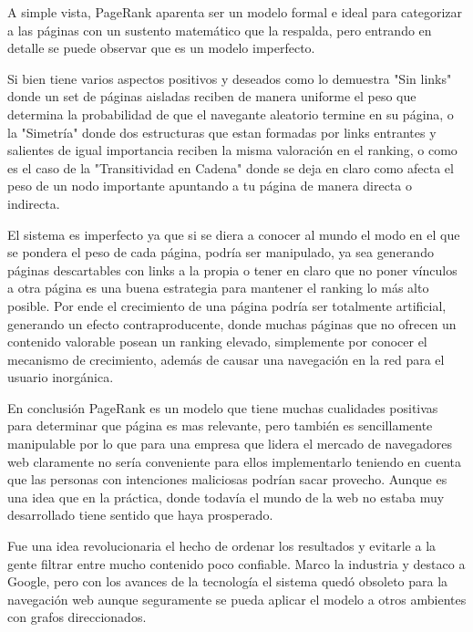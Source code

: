 \vspace{1em}

A simple vista, PageRank aparenta ser un modelo formal e ideal para categorizar a las páginas con un sustento matemático que la respalda, pero entrando en detalle se puede observar que es un modelo imperfecto.  

\vspace{1em}

Si bien tiene varios aspectos positivos y deseados como lo demuestra "Sin links" donde un set de páginas aisladas reciben de manera uniforme el peso que determina la probabilidad de que el navegante aleatorio termine en su página, o la "Simetría" donde dos estructuras que estan formadas por links entrantes y salientes de igual importancia reciben la misma valoración en el ranking, o como es el caso de la "Transitividad en Cadena" donde se deja en claro como afecta el peso de un nodo importante apuntando a tu página de manera directa o indirecta. 

\vspace{1em}

El sistema es imperfecto ya que si se diera a conocer al mundo el modo en el que se pondera el peso de cada página, podría ser manipulado, ya sea generando páginas descartables con links a la propia o tener en claro que no poner vínculos a otra página es una buena estrategia para mantener el ranking lo más alto posible. Por ende el crecimiento de una página podría ser totalmente artificial, generando un efecto contraproducente, donde muchas páginas que no ofrecen un contenido valorable posean un ranking elevado, simplemente por conocer el mecanismo de crecimiento, además de causar una navegación en la red para el usuario inorgánica.

\vspace{1em}

En conclusión PageRank es un modelo que tiene muchas cualidades positivas para determinar que página es mas relevante, pero también es sencillamente manipulable por lo que para una empresa que lidera el mercado de navegadores web claramente no sería conveniente para ellos implementarlo teniendo en cuenta que las personas con intenciones maliciosas podrían sacar provecho. Aunque es una idea que en la práctica, donde todavía el mundo de la web no estaba muy desarrollado tiene sentido que haya prosperado.

\vspace{1em}

Fue una idea revolucionaria el hecho de ordenar los resultados y evitarle a la gente filtrar entre mucho contenido poco confiable. Marco la industria y destaco a Google, pero con los avances de la tecnología el sistema quedó obsoleto para la navegación web aunque seguramente se pueda aplicar el modelo a otros ambientes con grafos direccionados.